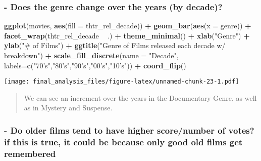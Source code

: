 \documentclass[]{article}
\newenvironment{Shaded}{\begin{snugshade}}{\end{snugshade}}
\newcommand{\KeywordTok}[1]{\textcolor[rgb]{0.13,0.29,0.53}{\textbf{#1}}}
\newcommand{\DataTypeTok}[1]{\textcolor[rgb]{0.13,0.29,0.53}{#1}}
\newcommand{\StringTok}[1]{\textcolor[rgb]{0.31,0.60,0.02}{#1}}
\newcommand{\OperatorTok}[1]{\textcolor[rgb]{0.81,0.36,0.00}{\textbf{#1}}}
\newcommand{\NormalTok}[1]{#1}
\begin{document}
\subsubsection{- Does the genre change over the years (by
decade)?}\label{does-the-genre-change-over-the-years-by-decade}

\begin{Shaded}
\begin{Highlighting}[]
\KeywordTok{ggplot}\NormalTok{(movies, }\KeywordTok{aes}\NormalTok{(}\DataTypeTok{fill =}\NormalTok{ thtr_rel_decade)) }\OperatorTok{+}\StringTok{ }\KeywordTok{geom_bar}\NormalTok{(}\KeywordTok{aes}\NormalTok{(}\DataTypeTok{x =}\NormalTok{ genre)) }\OperatorTok{+}\StringTok{ }\KeywordTok{facet_wrap}\NormalTok{(thtr_rel_decade }\OperatorTok{~}\StringTok{ }\NormalTok{.) }\OperatorTok{+}\StringTok{ }\KeywordTok{theme_minimal}\NormalTok{() }\OperatorTok{+}\StringTok{ }\KeywordTok{xlab}\NormalTok{(}\StringTok{"Genre"}\NormalTok{) }\OperatorTok{+}\StringTok{ }\KeywordTok{ylab}\NormalTok{(}\StringTok{"# of Films"}\NormalTok{) }\OperatorTok{+}\StringTok{ }\KeywordTok{ggtitle}\NormalTok{(}\StringTok{"Genre of Films released each decade w/ breakdown"}\NormalTok{) }\OperatorTok{+}\StringTok{ }\KeywordTok{scale_fill_discrete}\NormalTok{(}\DataTypeTok{name =} \StringTok{"Decade"}\NormalTok{, }\DataTypeTok{labels=}\KeywordTok{c}\NormalTok{(}\StringTok{"70's"}\NormalTok{,}\StringTok{"80's"}\NormalTok{,}\StringTok{"90's"}\NormalTok{,}\StringTok{"00's"}\NormalTok{,}\StringTok{"10's"}\NormalTok{)) }\OperatorTok{+}\StringTok{ }\KeywordTok{coord_flip}\NormalTok{()}
\end{Highlighting}
\end{Shaded}

\texttt{[image: final\_analysis\_files/figure-latex/unnamed-chunk-23-1.pdf]}

\begin{quote}
We can see an increment over the years in the Documentary Genre, as well
as in Mystery and Suspense.
\end{quote}

\subsubsection{- Do older films tend to have higher score/number of
votes? if this is true, it could be because only good old films get
remembered}\label{do-older-films-tend-to-have-higher-scorenumber-of-votes-if-this-is-true-it-could-be-because-only-good-old-films-get-remembered}
\end{document}
